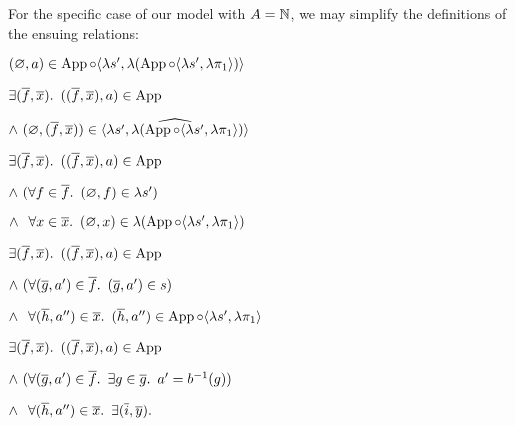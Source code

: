 For the specific case of our model with $A = \mathbb{N}$, we may simplify the definitions of the ensuing relations:
\begin{itemize}
  \step
    $(\varnothing,a)\in\operatorname{App}\circ\langle\lambda s^\prime,\lambda(\operatorname{App}\circ\langle\lambda s^\prime,\lambda\pi_1\rangle)\rangle$

  \step[\iffs]
    $\exists (\overline{f},\overline{x})\ldotp~((\overline{f},\overline{x}),a)\in\operatorname{App}$

  \addtolength{\itemsep}{-.2\baselineskip}
  \step
    \quad $\land~(\varnothing,(\overline{f},\overline{x}))\in\widehat{\langle\lambda s^\prime,\lambda(\operatorname{App}\circ\langle\lambda s^\prime,\lambda\pi_1\rangle)\rangle}$
  \addtolength{\itemsep}{.2\baselineskip}

  \step[\iffs]
    $\exists (\overline{f},\overline{x})\ldotp~((\overline{f},\overline{x}),a)\in\operatorname{App}$

  \addtolength{\itemsep}{-.2\baselineskip}
  \step
    \quad $\land~(\forall f\in\overline{f}\ldotp~(\varnothing,f)\in\lambda s^\prime)$

  \step
    \quad $\land~\phantom{(}\forall x\in\overline{x}\ldotp~(\varnothing,x)\in\lambda(\operatorname{App}\circ\langle\lambda s^\prime,\lambda\pi_1\rangle)$
  \addtolength{\itemsep}{.2\baselineskip}

  \step[\iffs]
    $\exists (\overline{f},\overline{x})\ldotp~((\overline{f},\overline{x}),a)\in\operatorname{App}$

  \addtolength{\itemsep}{-.2\baselineskip}
  \step
    \quad $\land~(\forall (\overline{g},a^\prime)\in\overline{f}\ldotp~(\overline{g},a^\prime)\in s)$
    \marginnote{\Def-$\lambda\cdot$}

  \step
    \quad $\land~\phantom{(}\forall (\overline{h},a^{\prime\prime})\in\overline{x}\ldotp~(\overline{h},a^{\prime\prime})\in\operatorname{App}\circ\langle\lambda s^\prime,\lambda\pi_1\rangle$
    \marginnote{\Def-$\lambda\cdot$}
  \addtolength{\itemsep}{.2\baselineskip}

  \step[\iffs]
    $\exists (\overline{f},\overline{x})\ldotp~((\overline{f},\overline{x}),a)\in\operatorname{App}$

  \addtolength{\itemsep}{-.2\baselineskip}
  \step
    \quad $\land~(\forall (\overline{g},a^\prime)\in\overline{f}\ldotp~\exists g\in\overline{g}\ldotp~a^\prime = b^{-1}(g))$

  \step
    \quad $\land~\phantom{(}\forall(\overline{h},a^{\prime\prime})\in\overline{x}\ldotp~\exists(\overline{i},\overline{y})\ldotp$
    \marginnote{\Def-\ref{def:crel-comp}}


\end{itemize}
